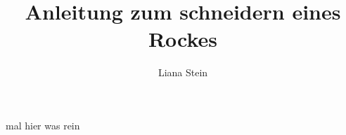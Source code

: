 \documentclass{scrartcl}
\begin{document}

  \title{Anleitung zum schneidern eines Rockes}
  \author{Liana Stein}
\maketitle
mal hier was rein
\end{document}
